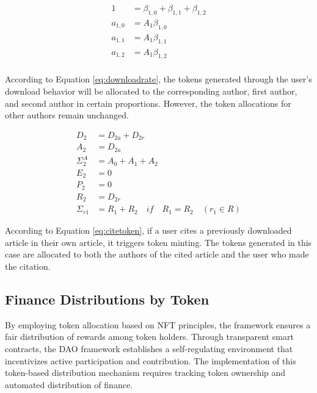 \documentclass[lettersize,journal]{IEEEtran}
\begin{document}
\begin{equation}
  \begin{aligned}
    1 &= \beta_{1, 0} + \beta_{1, 1} + \beta_{1, 2} \\
    a_{1,0} &= A_1 \beta_{1, 0}  \\
    a_{1,1} &= A_1 \beta_{1, 1}  \\
    a_{1,2} &= A_1 \beta_{1, 2}  \\
  \end{aligned}
  \label{eq:downloadrate}
\end{equation}

According to Equation \ref{eq:downloadrate}, the tokens generated through the user's download behavior will be allocated to the corresponding author, first author, and second author in certain proportions. However, the token allocations for other authors remain unchanged.


\begin{equation}
  \begin{aligned}
    D_2 &= D_{2a} + D_{2r} \\
    A_2 &= D_{2a} \\
    \Sigma^A_2 &= A_0 + A_1 + A_2 \\
    E_2 &= 0 \\
    P_2 &= 0 \\
    R_2 &= D_{2r} \\
    \Sigma_{r1} & = R_1 + R_2 \quad if \quad R_1 = R_2 \quad (r_1 \in R ) 
  \end{aligned}
  \label{eq:citetoken}
\end{equation}

According to Equation \ref{eq:citetoken}, if a user cites a previously downloaded article in their own article, it triggers token minting. The tokens generated in this case are allocated to both the authors of the cited article and the user who made the citation.



\subsection{Finance Distributions by Token}

By employing token allocation based on NFT principles, the framework ensures a fair distribution of rewards among token holders. Through transparent smart contracts, the DAO framework establishes a self-regulating environment that incentivizes active participation and contribution. The implementation of this token-based distribution mechanism requires tracking token ownership and automated distribution of finance.
\end{document}
